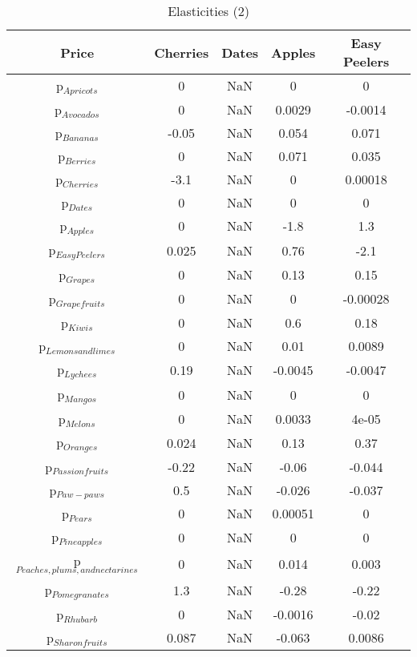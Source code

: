 \documentclass[11pt]{article}
\begin{document}
\begin{table}[h]
\caption{Elasticities (2)}
\label{Table: elasticities 2}
\begin{center}
\begin{tabular}{ccccc}
Price & Cherries & Dates & Apples & Easy Peelers \\ \hline
p$_{Apricots}$ & 0 & NaN & 0 & 0 \\ 
p$_{Avocados}$ & 0 & NaN & 0.0029 & -0.0014 \\ 
p$_{Bananas}$ & -0.05 & NaN & 0.054 & 0.071 \\ 
p$_{Berries}$ & 0 & NaN & 0.071 & 0.035 \\ 
p$_{Cherries}$ & -3.1 & NaN & 0 & 0.00018 \\ 
p$_{Dates}$ & 0 & NaN & 0 & 0 \\ 
p$_{Apples}$ & 0 & NaN & -1.8 & 1.3 \\ 
p$_{Easy Peelers}$ & 0.025 & NaN & 0.76 & -2.1 \\ 
p$_{Grapes}$ & 0 & NaN & 0.13 & 0.15 \\ 
p$_{Grapefruits}$ & 0 & NaN & 0 & -0.00028 \\ 
p$_{Kiwis}$ & 0 & NaN & 0.6 & 0.18 \\ 
p$_{Lemons and limes}$ & 0 & NaN & 0.01 & 0.0089 \\ 
p$_{Lychees}$ & 0.19 & NaN & -0.0045 & -0.0047 \\ 
p$_{Mangos}$ & 0 & NaN & 0 & 0 \\ 
p$_{Melons}$ & 0 & NaN & 0.0033 & 4e-05 \\ 
p$_{Oranges}$ & 0.024 & NaN & 0.13 & 0.37 \\ 
p$_{Passion fruits}$ & -0.22 & NaN & -0.06 & -0.044 \\ 
p$_{Paw-paws}$ & 0.5 & NaN & -0.026 & -0.037 \\ 
p$_{Pears}$ & 0 & NaN & 0.00051 & 0 \\ 
p$_{Pineapples}$ & 0 & NaN & 0 & 0 \\ 
p$_{Peaches, plums, and nectarines}$ & 0 & NaN & 0.014 & 0.003 \\ 
p$_{Pomegranates}$ & 1.3 & NaN & -0.28 & -0.22 \\ 
p$_{Rhubarb}$ & 0 & NaN & -0.0016 & -0.02 \\ 
p$_{Sharon fruits}$ & 0.087 & NaN & -0.063 & 0.0086 \\ 
\end{tabular}
\end{center}
\end{table}
\end{document}
